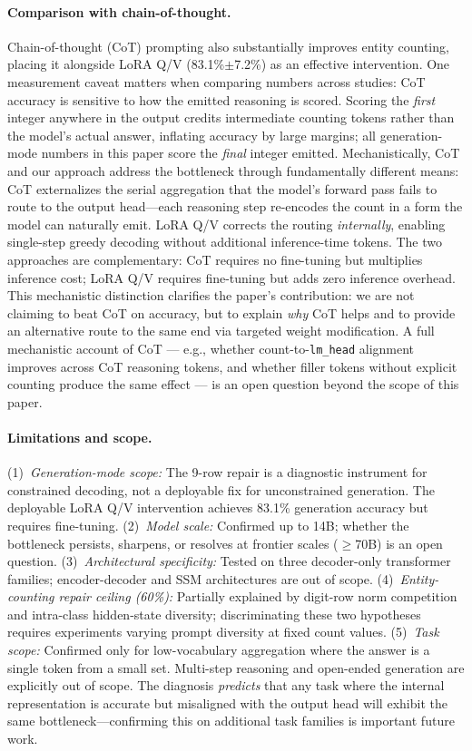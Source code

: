 \documentclass{article}
\begin{document}
\paragraph{Comparison with chain-of-thought.}
Chain-of-thought (CoT) prompting also substantially improves entity counting,
placing it alongside LoRA Q/V (83.1\%$\pm$7.2\%)
as an effective intervention. One measurement caveat matters when comparing
numbers across studies: CoT accuracy is sensitive to how the emitted reasoning
is scored. Scoring the \emph{first} integer anywhere in the output credits
intermediate counting tokens rather than the model's actual answer, inflating
accuracy by large margins; all generation-mode numbers in this paper score the
\emph{final} integer emitted. Mechanistically, CoT and our approach address the
bottleneck through fundamentally different means: CoT externalizes the
serial aggregation that the model's forward pass fails to route to the output
head---each reasoning step re-encodes the count in a form the model can
naturally emit. LoRA Q/V corrects the routing \emph{internally}, enabling
single-step greedy decoding without additional inference-time tokens. The two
approaches are complementary: CoT requires no fine-tuning but multiplies
inference cost; LoRA Q/V requires fine-tuning but adds zero inference overhead.
This mechanistic distinction clarifies the paper's contribution: we are not
claiming to beat CoT on accuracy, but to explain \emph{why} CoT helps and to
provide an alternative route to the same end via targeted weight modification.
A full mechanistic account of CoT --- e.g., whether count-to-\texttt{lm\_head}
alignment improves across CoT reasoning tokens, and whether filler tokens
without explicit counting produce the same effect --- is an open question
beyond the scope of this paper.

\paragraph{Limitations and scope.}
(1)~\emph{Generation-mode scope:} The 9-row repair is a diagnostic
instrument for constrained decoding, not a deployable fix for unconstrained
generation. The deployable LoRA Q/V intervention achieves 83.1\% generation
accuracy but requires fine-tuning. (2)~\emph{Model scale:} Confirmed up to
14B; whether the bottleneck persists, sharpens, or resolves at frontier scales
($\geq$70B) is an open question. (3)~\emph{Architectural specificity:} Tested
on three decoder-only transformer families; encoder-decoder and SSM
architectures are out of scope. (4)~\emph{Entity-counting repair ceiling
(60\%):} Partially explained by digit-row norm competition and intra-class
hidden-state diversity; discriminating these two hypotheses requires
experiments varying prompt diversity at fixed count values. (5)~\emph{Task
scope:} Confirmed only for low-vocabulary aggregation where the answer is a
single token from a small set. Multi-step reasoning and open-ended generation
are explicitly out of scope. The diagnosis \emph{predicts} that any task where
the internal representation is accurate but misaligned with the output head
will exhibit the same bottleneck---confirming this on additional task families
is important future work.
\end{document}
